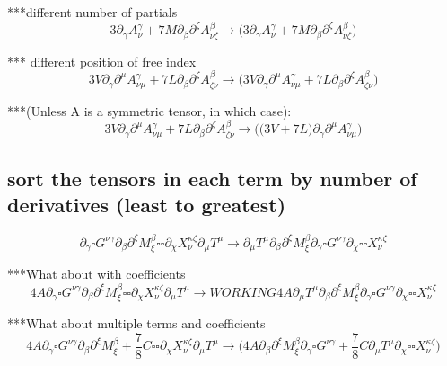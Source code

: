\documentclass{article}
\def\){\Big)}
\def\({\Big(}
\begin{document}
***different number of partials
\begin{equation}
3\partial_{\gamma}A^{\gamma}_{\nu} + 7M \partial_{\beta}\partial^{\zeta}A^{\beta}_{\nu \zeta} \rightarrow 
\(3 \partial_{\gamma}A_{\nu}^{\gamma} +7M \partial_{\beta}\partial^{\zeta}A_{\nu \zeta}^{\beta} \)
\end{equation}

*** different position of free index
\begin{equation}
3V\partial_{\gamma}\partial^{\mu}A^{\gamma}_{\nu \mu} + 7L \partial_{\beta}\partial^{\zeta}A^{\beta}_{\zeta \nu} \rightarrow 
\(3V \partial_{\gamma}\partial^{\mu}A_{\nu \mu}^{\gamma} +7L \partial_{\beta}\partial^{\zeta}A_{\zeta \nu}^{\beta} \)
\end{equation}

***(Unless A is a symmetric tensor, in which case):
\begin{equation}
3V\partial_{\gamma}\partial^{\mu}A^{\gamma}_{\nu \mu} + 7L \partial_{\beta}\partial^{\zeta}A^{\beta}_{\zeta \nu} \rightarrow 
\(\(3V+7L\) \partial_{\gamma}\partial^{\mu}A_{\nu \mu}^{\gamma} \)
\end{equation}


 \subsection{sort the tensors in each term by number of derivatives (least to greatest)}

\begin{equation}
\partial_{\gamma} \square G^{\nu \gamma} \partial_{\beta}\partial^{\xi} M^{\beta}_{\xi}   \square \square \partial_{\chi} X^{\kappa \zeta}_{\nu}  \partial_{\mu}T^{\mu} \rightarrow 
\partial_{\mu}T^{\mu} \partial_{\beta}\partial^{\xi}M_{\xi}^{\beta} \partial_{\gamma}\square G^{\nu \gamma} \partial_{\chi}\square \square X_{\nu}^{\kappa \zeta}
\end{equation}


***What about with coefficients
\begin{equation}
4A\partial_{\gamma} \square G^{\nu \gamma} \partial_{\beta}\partial^{\xi} M^{\beta}_{\xi}   \square \square \partial_{\chi} X^{\kappa \zeta}_{\nu}  \partial_{\mu}T^{\mu} \rightarrow WORKING
4 A \partial_{\mu}T^{\mu} \partial_{\beta}\partial^{\xi}M_{\xi}^{\beta} \partial_{\gamma}\square G^{\nu \gamma} \partial_{\chi}\square \square X_{\nu}^{\kappa \zeta}
\end{equation}

***What about multiple terms and coefficients
\begin{equation}
4A\partial_{\gamma} \square G^{\nu \gamma} \partial_{\beta}\partial^{\xi} M^{\beta}_{\xi} +
  \frac{7}{8} C \square \square \partial_{\chi} X^{\kappa \zeta}_{\nu}  \partial_{\mu}T^{\mu} \rightarrow 
\(4 A \partial_{\beta}\partial^{\xi}M_{\xi}^{\beta} \partial_{\gamma}\square G^{\nu \gamma} +\frac{7}{8} C \partial_{\mu}T^{\mu} \partial_{\chi}\square \square X_{\nu}^{\kappa \zeta} \)
\end{equation}
\end{document}

